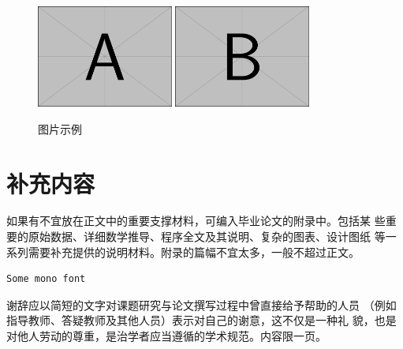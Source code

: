 \documentclass{swufethesis}
\begin{document}
\begin{figure}[htb]
  \centering
  \includegraphics[width=0.4\textwidth]{figures/example-image-a.pdf}
  \includegraphics[width=0.4\textwidth]{figures/example-image-b.pdf}
  \caption{图片示例}
\end{figure}

\printbibliography
\appendix
\chapter{补充内容}
如果有不宜放在正文中的重要支撑材料，可编入毕业论文的附录中。包括某
些重要的原始数据、详细数学推导、程序全文及其说明、复杂的图表、设计图纸
等一系列需要补充提供的说明材料。附录的篇幅不宜太多，一般不超过正文。
\begin{verbatim}
Some mono font
\end{verbatim}
\backmatter %
\begin{acknowledgments}
  谢辞应以简短的文字对课题研究与论文撰写过程中曾直接给予帮助的人员
  （例如指导教师、答疑教师及其他人员）表示对自己的谢意，这不仅是一种礼
  貌，也是对他人劳动的尊重，是治学者应当遵循的学术规范。内容限一页。
\end{acknowledgments}
\end{document}
